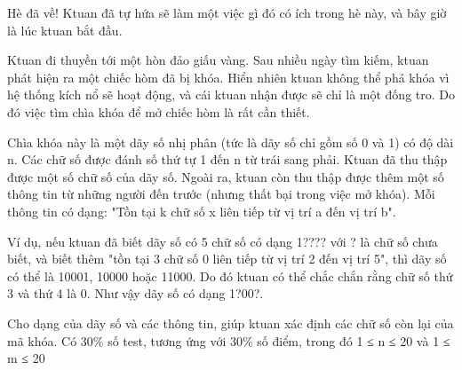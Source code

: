 Hè đã về! Ktuan đã tự hứa sẽ làm một việc gì đó có ích trong hè này, và bây giờ là lúc ktuan bắt đầu.

Ktuan đi thuyền tới một hòn đảo giấu vàng. Sau nhiều ngày tìm kiếm, ktuan phát hiện ra một chiếc hòm đã bị khóa. Hiển nhiên ktuan không thể phá khóa vì hệ thống kích nổ sẽ hoạt động, và cái ktuan nhận được sẽ chỉ là một đống tro. Do đó việc tìm chìa khóa để mở chiếc hòm là rất cần thiết.

Chìa khóa này là một dãy số nhị phân (tức là dãy số chỉ gồm số 0 và 1) có độ dài n. Các chữ số được đánh số thứ tự 1 đến n từ trái sang phải. Ktuan đã thu thập được một số chữ số của dãy số. Ngoài ra, ktuan còn thu thập được thêm một số thông tin từ những người đến trước (nhưng thất bại trong việc mở khóa). Mỗi thông tin có dạng: "Tồn tại k chữ số x liên tiếp từ vị trí a đến vị trí b".

Ví dụ, nếu ktuan đã biết dãy số có 5 chữ số có dạng 1???? với ? là chữ số chưa biết, và biết thêm "tồn tại 3 chữ số 0 liên tiếp từ vị trí 2 đến vị trí 5", thì dãy số có thể là 10001, 10000 hoặc 11000. Do đó ktuan có thể chắc chắn rằng chữ số thứ 3 và thứ 4 là 0. Như vậy dãy số có dạng 1?00?.

Cho dạng của dãy số và các thông tin, giúp ktuan xác định các chữ số còn lại của mã khóa.
Có 30\% số test, tương ứng với 30\% số điểm, trong đó 1 ≤ n ≤ 20 và 1 ≤ m ≤ 20